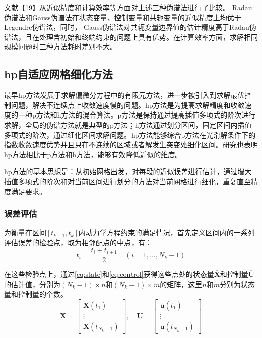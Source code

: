 文献【19】从近似精度和计算效率等方面对上述三种伪谱法进行了比较。 Radau伪谱法和Gauss伪谱法在状态变量、控制变量和共轭变量的近似精度上均优于 Legendre伪谱法，同时， Gauss伪谱法对共轭变量边界值的估计精度高于Radau伪谱法，且在处理含初始和终端约束的问题上具有优势。在计算效率方面，求解相同规模问题时三种方法耗时差别不大。

\subsection{hp自适应网格细化方法}
最早hp方法发展于求解偏微分方程中的有限元方法，进一步被引入到求解最优控制问题，解决不连续点上收敛速度慢的问题。hp方法是为提高求解精度和收敛速度的一种p方法和h方法的混合算法。p方法是保持通过提高插值多项式的阶次进行求解，全局的伪谱方法就是典型的p方法；h方法通过划分区间，固定区间内插值多项式的阶次，通过细化区间求解问题。hp方法能够综合p方法在光滑解条件下的指数收敛速度优势并且只在不连续的区域或者解发生突变处细化区间。研究也表明hp方法相比于p方法和h方法，能够有效降低近似的维度。

hp方法的基本思想是：从初始网格出发，对每段的近似误差进行估计，通过增大插值多项式的阶次和对当前区间进行划分的方法对当前网格进行细化，重复直至精度满足要求。

\subsubsection{误差评估}
为衡量在区间$ [t_{k-1},t_k] $内动力学方程约束的满足情况，首先定义区间内的一系列评估误差的检验点，取为相邻配点的中点，有：
\begin{equation}
	\bar{t}_{i}=\frac{t_{i}+t_{i+1}}{2} \quad\left(i=1, \ldots, N_{k}-1\right)
\end{equation}

在这些检验点上，通过\eqref{eq:state}和\eqref{eq:control}获得这些点处的状态量$ \overline{\boldsymbol{X}} $和控制量$ \overline{\boldsymbol{U}} $的估计值，分别为$ (N_k-1)\times n $和$ (N_k-1)\times m $的矩阵，这里$ n $和$ m $分别为状态量和控制量的个数。
\begin{equation}
	\overline{\boldsymbol{X}}=\left[\begin{array}{c}
			\boldsymbol{X}\left(\bar{t}_{1}\right) \\
			\vdots                                 \\
			\boldsymbol{X}\left(\bar{t}_{N_{k}-1}\right)
		\end{array}\right], \quad \overline{\boldsymbol{U}}=\left[\begin{array}{c}
			\boldsymbol{u}\left(\bar{t}_{1}\right) \\
			\vdots                                 \\
			\boldsymbol{u}\left(\bar{t}_{N_{k}-1}\right)
		\end{array}\right]
\end{equation}

